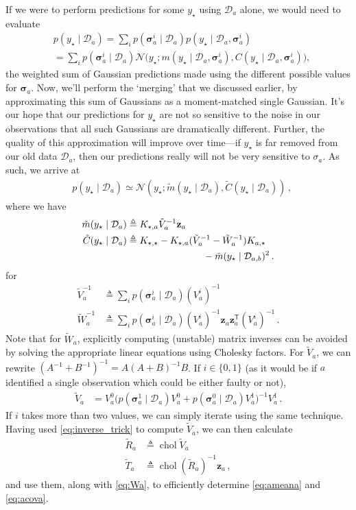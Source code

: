 \documentclass{article}
\newcommand{\given}{\ensuremath{\mid}}
\newcommand{\cm}[1]{\ensuremath{\mathcal{#1}}}
\newcommand{\bm}[1]{\ensuremath{\mathbf{#1}}}
\newcommand{\data}{\ensuremath{\cm{D}}}
\newcommand{\vect}[1]{\bm{#1}}
\newcommand{\vz}{\vect{z}}
\newcommand{\vs}{\vect{\sigma}}
\newcommand{\amean}[2]{\tilde{{m}}(#1 \given #2 )}
\newcommand{\acov}[2]{\tilde{{C}}(#1 \given #2 )}
\newcommand{\p}[2]{p(#1 \given #2 )}
\newcommand{\fPr}{p}
\newcommand{\Prob}[2]{\fPr(#1 \given #2 )}
\newcommand{\mean}[2]{{m}(#1 \given #2 )}
\newcommand{\cov}[2]{{C}(#1 \given #2 )}
\newcommand{\N}[3]{\cm{N}( #1;#2,#3 )}
\newcommand{\st}{_{\star}}
\newcommand{\tr}{\ensuremath{\mathsf{T}}}
\newcommand{\defequal}{\triangleq}
\DeclareMathOperator{\chol}{chol}
\begin{document}
If we were to perform predictions for some $y\st$ using $\data_a$
alone, we would need to evaluate
\begin{align*}
&\p{y\st}{\data_{a}} = \sum_{i} \Prob{\vs^i_{a}}{\data_a} \p{y\st}{\data_a, \vs^{i}_{a}}\nonumber\\
&=\sum_{i} \Prob{\vs^i_{a}}{\data_a} \cm{N}\bigl(y\st; \mean{y\st}{\data_a, \vs^{i}_{a}}, \cov{y\st}{\data_a, \vs^{i}_{a}}\bigr),
\end{align*}
the weighted sum of Gaussian predictions made using the different
possible values for $\vs_{a}$.  Now, we'll perform the `merging' that
we discussed earlier, by approximating this sum of Gaussians as a
moment-matched single Gaussian. It's our hope that our predictions for
$y\st$ are not so sensitive to the noise in our observations that all
such Gaussians are dramatically different. Further, the quality of
this approximation will improve over time---if $y\st$ is far removed
from our old data $\data_a$, then our predictions really will not be
very sensitive to $\sigma_a$. As such, we arrive at
\begin{align}
 &\p{y\st}{\data_{a}} \simeq \N{y\st}{\amean{y\st}{\data_a}}{\acov{y\st}{\data_a}}\,,\label{eq:pya}
\end{align}
where we have
\begin{align}
\amean{y\st}{\data_{a}} & \defequal  K_{\star,a} \tilde{V}_a^{-1} \vz_a\label{eq:ameana}\\
\acov{y\st}{\data_{a}}
& \defequal K_{\star,\star} - K_{\star,a}(\tilde{V}_a^{-1}-\tilde{W}_a^{-1})K_{a,\star} \nonumber\\
& \hspace{2.8cm} - \amean{y\st}{\data_{a,b}}^2 \,.\label{eq:acova}
\end{align}
for
\begin{align}
 \tilde{V}_a^{-1}  & \defequal \sum_i \Prob{\vs^i_{a}}{\data_a} (V_a^i)^{-1}\nonumber\\
 \tilde{W}_a^{-1} & \defequal \sum_i \Prob{\vs^i_{a}}{\data_a} (V_a^i)^{-1}\vz_a \vz_a^\tr (V_a^i)^{-1}\,.\label{eq:Wa}
\end{align}
Note that for $\tilde{W}_a$, explicitly computing (unstable) matrix
inverses can be avoided by solving the appropriate linear equations
using Cholesky factors.  For $\tilde{V}_a$, we can rewrite
$(A^{-1}+B^{-1})^{-1} = A (A+B)^{-1} B$. If $i\in\{0,1\}$ (as it would
be if $a$ identified a single observation which could be either faulty
or not),
\begin{align} \label{eq:inverse_trick}
\tilde{V}_a & = V^0_a\bigl(
\Prob{\vs^1_{a}}{\data_a} V^0_a 
+ 
\Prob{\vs^0_{a}}{\data_a} V^1_a
\bigr)^{-1}V^1_a\,.
\end{align}
If $i$ takes more than two values, we can simply iterate using the
same technique. Having used \eqref{eq:inverse_trick} to compute
$\tilde{V}_a$, we can then calculate
\begin{align}
 \tilde{R}_a & \defequal \chol \tilde{V}_a \label{eq:Ra} \\
 \tilde{T}_a & \defequal \chol (\tilde{R}_a)^{-1} \vz_a \label{eq:Ta} \,,
\end{align}
and use them, along with \eqref{eq:Wa}, to efficiently determine
\eqref{eq:ameana} and \eqref{eq:acova}.
\end{document}

